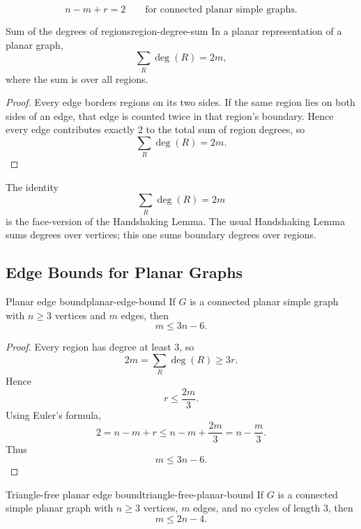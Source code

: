 \begin{keyformula}[title={Euler's Formula}]
\[
n-m+r=2
\qquad
\text{for connected planar simple graphs.}
\]
\end{keyformula}

\begin{theorem}{Sum of the degrees of regions}{region-degree-sum}
In a planar representation of a planar graph,
\[
\sum_R \deg(R)=2m,
\]
where the sum is over all regions.
\end{theorem}

\begin{proof}
Every edge borders regions on its two sides. If the same region lies on both sides of an edge, that edge is counted twice in that region's boundary. Hence every edge contributes exactly \(2\) to the total sum of region degrees, so
\[
\sum_R\deg(R)=2m.
\]
\end{proof}

\begin{extension}[title={Dual handshaking idea}]
The identity
\[
\sum_R\deg(R)=2m
\]
is the face-version of the Handshaking Lemma. The usual Handshaking Lemma sums degrees over vertices; this one sums boundary degrees over regions.
\end{extension}

\subsection{Edge Bounds for Planar Graphs}

\begin{theorem}{Planar edge bound}{planar-edge-bound}
If \(G\) is a connected planar simple graph with \(n\ge 3\) vertices and \(m\) edges, then
\[
m\le 3n-6.
\]
\end{theorem}

\begin{proof}
Every region has degree at least \(3\), so
\[
2m=\sum_R\deg(R)\ge 3r.
\]
Hence
\[
r\le \frac{2m}{3}.
\]
Using Euler's formula,
\[
2=n-m+r\le n-m+\frac{2m}{3}=n-\frac{m}{3}.
\]
Thus
\[
m\le 3n-6.
\]
\end{proof}

\begin{theorem}{Triangle-free planar edge bound}{triangle-free-planar-bound}
If \(G\) is a connected simple planar graph with \(n\ge 3\) vertices, \(m\) edges, and no cycles of length \(3\), then
\[
m\le 2n-4.
\]
\end{theorem}

